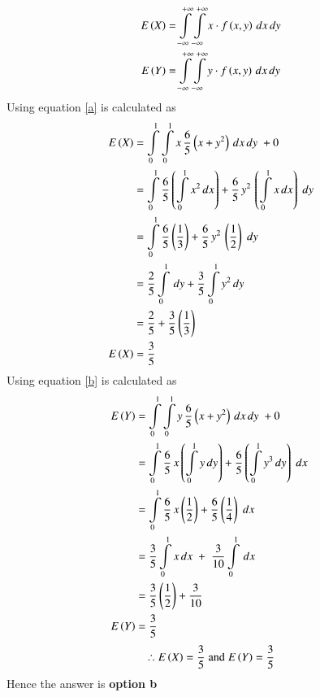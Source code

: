 \documentclass[journal,12pt,twocolumn]{IEEEtran}
\begin{document}
\begin{align}
E\left(X\right) &= \int\limits_{-\infty}^{+\infty}\int\limits_{-\infty}^{+\infty} x \cdot f\left(x,y\right)\,dx\,dy \label{a} \\ 
E\left(Y\right) &= \int\limits_{-\infty}^{+\infty}\int\limits_{-\infty}^{+\infty} y \cdot f\left(x,y\right)\,dx\,dy \label{b}
\end{align}
Using equation \eqref{a}  is calculated as 
\newpage
\begin{align*}
E\left(X\right) &= \int\limits_{0}^{1}\int\limits_{0}^{1} x\,\dfrac{6}{5}\left(x+y^2\right)\,dx\,dy \;+ 0 \\ 
      &= \int\limits_{0}^{1}\dfrac{6}{5}\left(\int\limits_{0}^{1}x^2\,dx\right)+\dfrac{6}{5}\,y^2\,\left(\int\limits_{0}^{1}x\,dx\right)\;dy   \\
      &= \int\limits_{0}^{1}\dfrac{6}{5}\left(\dfrac{1}{3}\right)+\dfrac{6}{5}\,y^2\,\left(\dfrac{1}{2}\right)\;dy \\
      &= \dfrac{2}{5}\int\limits_{0}^{1}\,dy + \dfrac{3}{5}\int\limits_{0}^{1}y^2\,dy  \\
      &= \dfrac{2}{5} + \dfrac{3}{5}\left(\dfrac{1}{3}\right) \\
E\left(X\right) &=  \dfrac{3}{5}  
\end{align*}
Using equation \eqref{b}  is calculated as
\begin{align*}
E\left(Y\right) &= \int\limits_{0}^{1}\int\limits_{0}^{1} y\,\dfrac{6}{5}\left(x+y^2\right)\,dx\,dy \;+ 0 \\ 
      &= \int\limits_{0}^{1}\dfrac{6}{5}\,x\left(\int\limits_{0}^{1}y\,dy\right) + \dfrac{6}{5}\left(\int\limits_{0}^{1}y^{3}\,dy\right)\;dx \; \\ 
      &= \int\limits_{0}^{1}\dfrac{6}{5}\,x\left(\dfrac{1}{2}\right) + \dfrac{6}{5}\left(\dfrac{1}{4}\right)\;dx \; \\ 
      &= \dfrac{3}{5}\int\limits_{0}^{1}x\,dx\;+\;\dfrac{3}{10}\int\limits_{0}^{1}\,dx  \\
      &= \dfrac{3}{5} \left(\dfrac{1}{2}\right) + \dfrac{3}{10} \\
E\left(Y\right) &= \dfrac{3}{5}      
\end{align*}
 $$\therefore E\left(X\right) = \dfrac{3}{5}\;\text{and}\;E\left(Y\right) = \dfrac{3}{5}$$ 
 Hence the answer is \textbf{option b}
\end{document}
